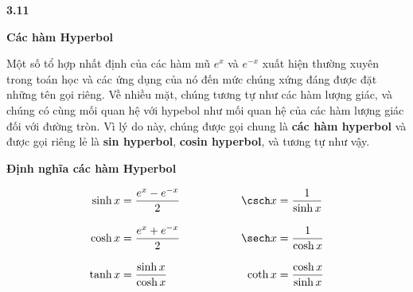 \vspace{14pt}

\noindent
\begin{minipage}[b]{120pt}
    \raggedleft
    \hspace{7pt}%
    {\fontsize{22}{22}\selectfont\sffamily\bfseries\color{stewartcyan}3.11}
\end{minipage}%
\hspace{16pt}%
\begin{minipage}[b]{368pt}
    {\fontsize{20}{22}\selectfont\sffamily\bfseries Các hàm Hyperbol}
\end{minipage}

\vspace{12pt}

\noindent
\begin{minipage}[t]{120pt}
    \null
\end{minipage}%
\hspace{16pt}%
\begin{minipage}[t]{368pt}
    \noindent{\color{stewartcyan}\rule{6.5pt}{6.5pt}}\par
    \vspace{7pt}

    \fontsize{9.5}{13.5}\selectfont
    Một số tổ hợp nhất định của các hàm mũ $e^x$ và $e^{-x}$ xuất hiện thường xuyên trong toán học và các ứng dụng của nó đến mức chúng xứng đáng được đặt những tên gọi riêng. Về nhiều mặt, chúng tương tự như các hàm lượng giác, và chúng có cùng mối quan hệ với hypebol như mối quan hệ của các hàm lượng giác đối với đường tròn. Vì lý do này, chúng được gọi chung là \textbf{các hàm hyperbol} và được gọi riêng lẻ là \textbf{sin hyperbol}, \textbf{cosin hyperbol}, và tương tự như vậy.
    \vspace{10pt}

    \begin{definitionbox}
        {\sffamily\bfseries\color{stewartred}\fontsize{10.5}{13}\selectfont Định nghĩa các hàm Hyperbol}\par
        \vspace{4pt}
        \begin{alignat*}{2}
            \sinh x &= \frac{e^x - e^{-x}}{2} &\hspace{4.5em} \csch x &= \frac{1}{\sinh x} \\[8pt]
            \cosh x &= \frac{e^x + e^{-x}}{2} &\hspace{4.5em} \sech x &= \frac{1}{\cosh x} \\[8pt]
            \tanh x &= \frac{\sinh x}{\cosh x} &\hspace{4.5em} \coth x &= \frac{\cosh x}{\sinh x}
        \end{alignat*}
    \end{definitionbox}
\end{minipage}
